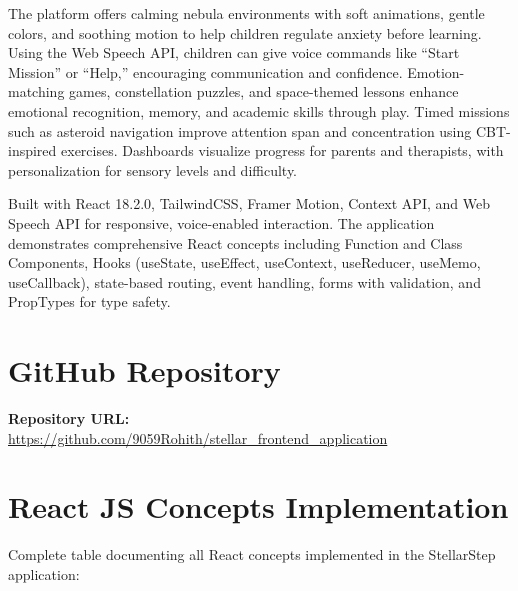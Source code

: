 \documentclass[11pt,a4paper]{article}
\begin{document}
The platform offers calming nebula environments with soft animations, gentle colors, and soothing motion to help children regulate anxiety before learning. Using the Web Speech API, children can give voice commands like ``Start Mission'' or ``Help,'' encouraging communication and confidence. Emotion-matching games, constellation puzzles, and space-themed lessons enhance emotional recognition, memory, and academic skills through play. Timed missions such as asteroid navigation improve attention span and concentration using CBT-inspired exercises. Dashboards visualize progress for parents and therapists, with personalization for sensory levels and difficulty.

Built with React 18.2.0, TailwindCSS, Framer Motion, Context API, and Web Speech API for responsive, voice-enabled interaction. The application demonstrates comprehensive React concepts including Function and Class Components, Hooks (useState, useEffect, useContext, useReducer, useMemo, useCallback), state-based routing, event handling, forms with validation, and PropTypes for type safety.


\section{GitHub Repository}
\textbf{Repository URL:} 
\url{https://github.com/9059Rohith/stellar_frontend_application}



\newpage

\section{React JS Concepts Implementation}

Complete table documenting all React concepts implemented in the StellarStep application:

\vspace{0.5cm}
\end{document}
